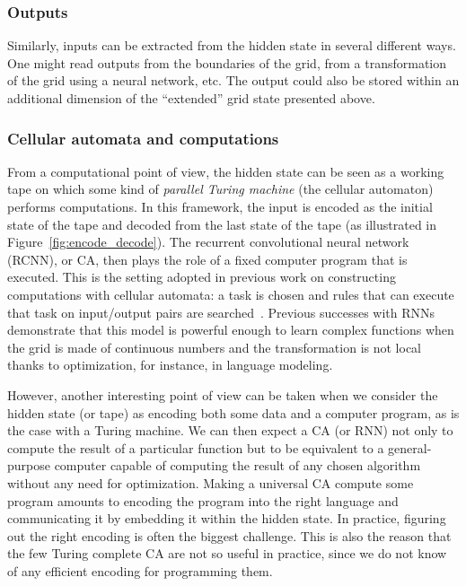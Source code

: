 \subsubsection{Outputs}

Similarly, inputs can be extracted from the hidden state in several different
ways. One might read outputs from the boundaries of the grid, from a
transformation of the grid using a neural network, etc. The output could also be
stored within an additional dimension of the ``extended'' grid state presented
above.

\subsubsection{Cellular automata and computations}

From a computational point of view, the hidden state can be seen as a working
tape on which some kind of \emph{parallel Turing machine} (the cellular automaton)
performs computations. In this framework, the input is encoded as the
initial state of the tape and decoded from the last state of the tape (as
illustrated in Figure~\ref{fig:encode_decode}). The recurrent convolutional
neural network (RCNN), or \ac{CA}, then plays the role of a fixed computer
program that is executed. This is the setting adopted in previous work on
constructing computations with cellular automata: a task is chosen and rules that 
can execute that task on input/output pairs
are searched~\parencite{mitchellComputationCellularAutomata2005}. Previous successes
with \acp{RNN} demonstrate that this model is powerful enough to learn complex
functions when the grid is made of continuous numbers and the transformation is
not local thanks to optimization, for instance, in language modeling.

However, another interesting point of view can be taken when we consider the
hidden state (or tape) as encoding both some data and a computer program, as is
the case with a Turing machine. We can then expect a \ac{CA} (or \ac{RNN}) not
only to compute the result of a particular function but to be equivalent to a
general-purpose computer capable of computing the result of any chosen algorithm
without any need for optimization. Making a universal \ac{CA} compute some
program amounts to encoding the program into the right language and
communicating it by embedding it within the hidden state. In practice, figuring
out the right encoding is often the biggest challenge. This is also the reason
that the few Turing complete \ac{CA} are not so useful in practice, since we do
not know of any efficient encoding for programming them.

